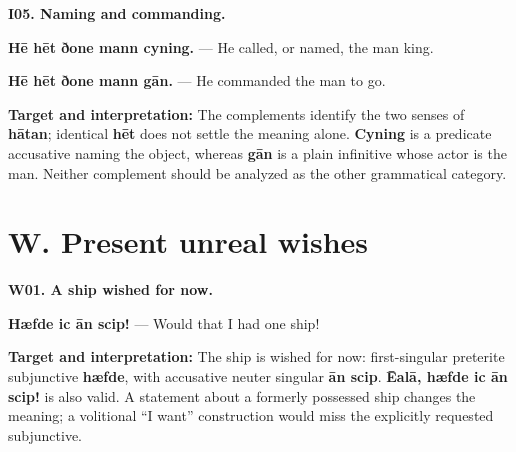 \par\begin{minipage}{\linewidth}\raggedright
\textbf{I05. Naming and commanding.}

\textbf{Hē hēt ðone mann cyning.} — He called, or named, the man king.

\textbf{Hē hēt ðone mann gān.} — He commanded the man to go.

\textbf{Target and interpretation:} The complements identify the two senses of \textbf{hātan}; identical \textbf{hēt} does not settle the meaning alone. \textbf{Cyning} is a predicate accusative naming the object, whereas \textbf{gān} is a plain infinitive whose actor is the man. Neither complement should be analyzed as the other grammatical category.

\end{minipage}\par\addvspace{4pt}

\section*{W. Present unreal wishes}

\par\begin{minipage}{\linewidth}\raggedright
\textbf{W01. A ship wished for now.}

\textbf{Hæfde ic ān scip!} — Would that I had one ship!

\textbf{Target and interpretation:} The ship is wished for now: first-singular preterite subjunctive \textbf{hæfde}, with accusative neuter singular \textbf{ān scip}. \textbf{Ēalā, hæfde ic ān scip!} is also valid. A statement about a formerly possessed ship changes the meaning; a volitional “I want” construction would miss the explicitly requested subjunctive.

\end{minipage}\par\addvspace{4pt}

